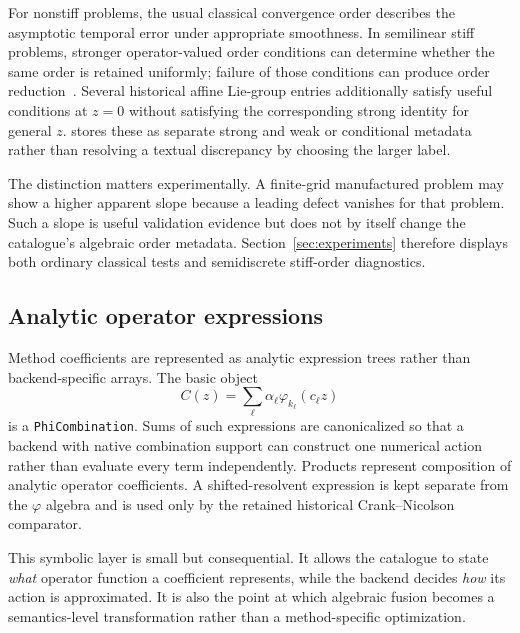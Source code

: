 For nonstiff problems, the usual classical convergence order describes the
asymptotic temporal error under appropriate smoothness.  In semilinear stiff
problems, stronger operator-valued order conditions can determine whether the
same order is retained uniformly; failure of those conditions can produce
order reduction~\cite{HochbruckOstermann2005,HochbruckOstermann2010}.  Several
historical affine Lie-group entries additionally satisfy useful conditions at
$z=0$ without satisfying the corresponding strong identity for general $z$.
\pkg{} stores these as separate strong and weak or conditional metadata
rather than resolving a textual discrepancy by choosing the larger label.

The distinction matters experimentally.  A finite-grid manufactured problem
may show a higher apparent slope because a leading defect vanishes for that
problem.  Such a slope is useful validation evidence but does not by itself
change the catalogue's algebraic order metadata.  Section~\ref{sec:experiments}
therefore displays both ordinary classical tests and semidiscrete stiff-order
diagnostics.

\subsection{Analytic operator expressions}

Method coefficients are represented as analytic expression trees rather than
backend-specific arrays.  The basic object
\begin{equation}
  C(z)=\sum_{\ell} \alpha_\ell\varphi_{k_\ell}(c_\ell z)
  \label{eq:phi-combination}
\end{equation}
is a \texttt{PhiCombination}.  Sums of such expressions are canonicalized so
that a backend with native combination support can construct one numerical
action rather than evaluate every term independently.  Products represent
composition of analytic operator coefficients.  A shifted-resolvent expression
is kept separate from the $\varphi$ algebra and is used only by the retained
historical Crank--Nicolson comparator.

This symbolic layer is small but consequential.  It allows the catalogue to
state \emph{what} operator function a coefficient represents, while the backend
decides \emph{how} its action is approximated.  It is also the point at which
algebraic fusion becomes a semantics-level transformation rather than a
method-specific optimization.
